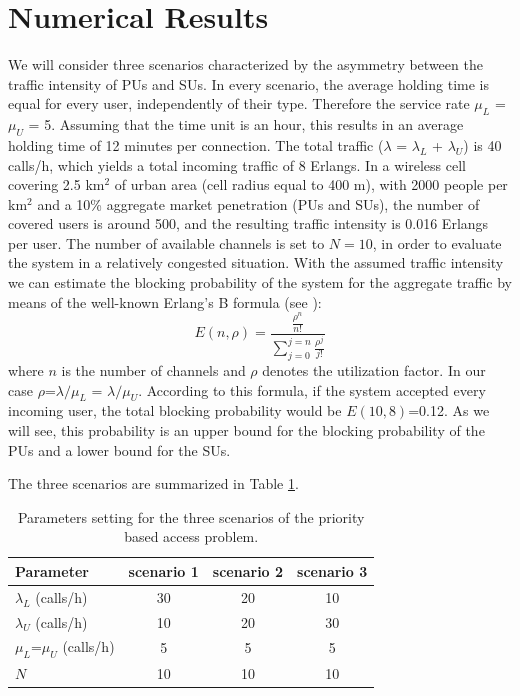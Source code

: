 \section{Numerical Results}\label{Sarnoff_sec_numerical}
We will consider three scenarios characterized by the asymmetry between the traffic intensity of PUs and SUs. In every scenario, the average holding time is equal for every user, independently of their type. Therefore the service rate $\mu_{L}$ =$\mu_{U}$ = 5. Assuming that the time unit is an hour, this results in an average holding time of 12 minutes per connection. The total traffic ($\lambda$ = $\lambda_{L}$ + $\lambda_{U}$) is 40 calls/h, which yields a total incoming traffic of 8 Erlangs. In a wireless cell covering 2.5 km$^{2}$ of urban area (cell radius equal to 400 m), with 2000 people per km$^{2}$ and a 10\% aggregate market penetration (PUs and SUs), the number of covered users is around 500, and the resulting traffic intensity is 0.016 Erlangs per user. The number of available channels is set to $N=10$, in order to evaluate the system in a relatively congested situation. With the assumed traffic intensity we can estimate the blocking probability of the system for the aggregate traffic by means of the well-known Erlang's B formula (see \cite{ref:Klei}):
\begin{equation}
E\left(n,\rho\right)=\displaystyle\frac{\frac{\rho^{n}}{n!}}{\sum_{j=0}^{j=n}\frac{\rho^{j}}{j!}}
\end{equation}
where $n$ is the number of channels and $\rho$ denotes the utilization factor. In our case $\rho$=$\lambda/\mu_{L}$ = $\lambda/\mu_{U}$. According to this formula, if the system accepted every incoming user, the total blocking probability would be $E\left(10,8\right)$=0.12. As we will see, this probability is an upper bound for the blocking probability of the PUs and a lower bound for the SUs.

The three scenarios are summarized in Table \ref{tab:table1}.

\begin{table}[h]
\centering
\begin{tabular}{lccc} \hline
 \textbf{Parameter} & \textbf{scenario 1} & \textbf{scenario 2} & \textbf{scenario 3}\\\hline
$\lambda_{L}$ (calls/h) & 30 & 20 & 10\\
$\lambda_{U}$ (calls/h) & 10 & 20 & 30\\
$\mu_{L}$=$\mu_{U}$ (calls/h) & 5 & 5 & 5\\
$N$ & 10 & 10 & 10\\\hline
\end{tabular}
\caption{Parameters setting for the three scenarios of the priority based access problem.}\label{tab:table1}
\centering
\end{table}

